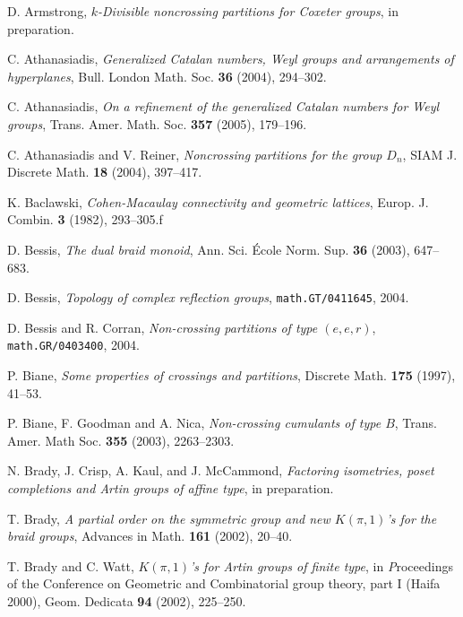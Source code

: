 \documentclass[12pt,letterpaper, reqno]{amsart}
\begin{document}
\begin{thebibliography}{99}

D. Armstrong, \emph{$k$-Divisible noncrossing partitions for Coxeter groups}, in preparation.

C. Athanasiadis, \emph{Generalized Catalan numbers, Weyl groups and arrangements of hyperplanes}, Bull. London Math. Soc. {\bf 36} (2004), 294--302.

C. Athanasiadis, \emph{On a refinement of the generalized Catalan numbers for Weyl groups}, Trans. Amer. Math. Soc. {\bf 357} (2005), 179--196.

C. Athanasiadis and V. Reiner, \emph{Noncrossing partitions for the group $D_n$}, SIAM J. Discrete Math. {\bf 18} (2004), 397--417.

K. Baclawski, \emph{Cohen-Macaulay connectivity and geometric lattices}, Europ. J. Combin. {\bf 3} (1982), 293--305.f

D. Bessis, \emph{The dual braid monoid}, Ann. Sci. \'Ecole Norm. Sup. {\bf 36} (2003), 647--683.

D. Bessis, \emph{Topology of complex reflection groups}, \texttt{math.GT/0411645}, 2004.

D. Bessis and R. Corran, \emph{Non-crossing partitions of type $(e,e,r)$}, \texttt{math.GR/0403400}, 2004.

P. Biane, \emph{Some properties of crossings and partitions}, Discrete Math. {\bf 175} (1997), 41--53.

P. Biane, F. Goodman and A. Nica, \emph{Non-crossing cumulants of type $B$}, Trans. Amer. Math Soc. {\bf 355} (2003), 2263--2303.

N. Brady, J. Crisp, A. Kaul, and J. McCammond, \emph{Factoring isometries, poset completions and Artin groups of affine type}, in preparation.

T. Brady, \emph{A partial order on the symmetric group and new $K(\pi,1)$'s for the braid groups}, Advances in Math. {\bf 161} (2002), 20--40.

T. Brady and C. Watt, \emph{$K(\pi,1)$'s for Artin groups of finite type}, in {\emph Proceedings of the Conference on Geometric and Combinatorial group theory, part I (Haifa 2000)}, Geom. Dedicata {\bf 94} (2002), 225--250.


\end{thebibliography}
\end{document}

